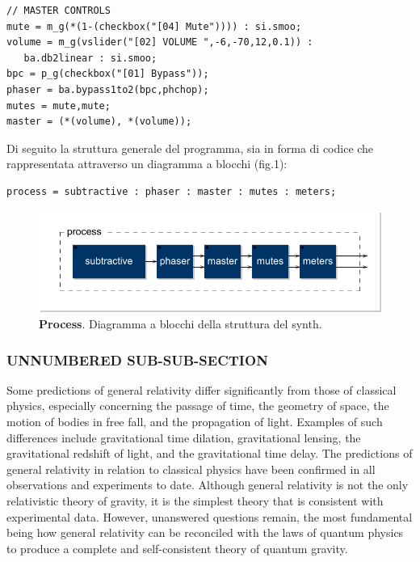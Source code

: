 \documentclass[
	a4paper,
	twocolumn
	]{article}
\begin{document}
\begin{lstlisting}
// MASTER CONTROLS
mute = m_g(*(1-(checkbox("[04] Mute")))) : si.smoo;
volume = m_g(vslider("[02] VOLUME ",-6,-70,12,0.1)) :
   ba.db2linear : si.smoo;
bpc = p_g(checkbox("[01] Bypass"));
phaser = ba.bypass1to2(bpc,phchop);
mutes = mute,mute;
master = (*(volume), *(volume));
\end{lstlisting}

Di seguito la struttura generale del programma, sia in forma di codice che
rappresentata attraverso un diagramma a blocchi (fig.1):

\begin{lstlisting}
process = subtractive : phaser : master : mutes : meters;
\end{lstlisting}

\begin{figure}[h]
\begin{center}
\includegraphics[width=.47\textwidth]{img/process}
\caption{\textbf{Process}. Diagramma a blocchi della struttura del synth.}
\label{gr01}
\end{center}
\end{figure}


\subsubsection*{UNNUMBERED SUB-SUB-SECTION}
Some predictions of general relativity differ significantly from those of
classical physics, especially concerning the passage of time, the geometry of
space, the motion of bodies in free fall, and the propagation of light. Examples
of such differences include gravitational time dilation, gravitational lensing,
the gravitational redshift of light, and the gravitational time delay. The
predictions of general relativity in relation to classical physics have been
confirmed in all observations and experiments to date. Although general
relativity is not the only relativistic theory of gravity, it is the simplest
theory that is consistent with experimental data. However, unanswered questions
remain, the most fundamental being how general relativity can be reconciled with
the laws of quantum physics to produce a complete and self-consistent theory of
quantum gravity.
\end{document}

